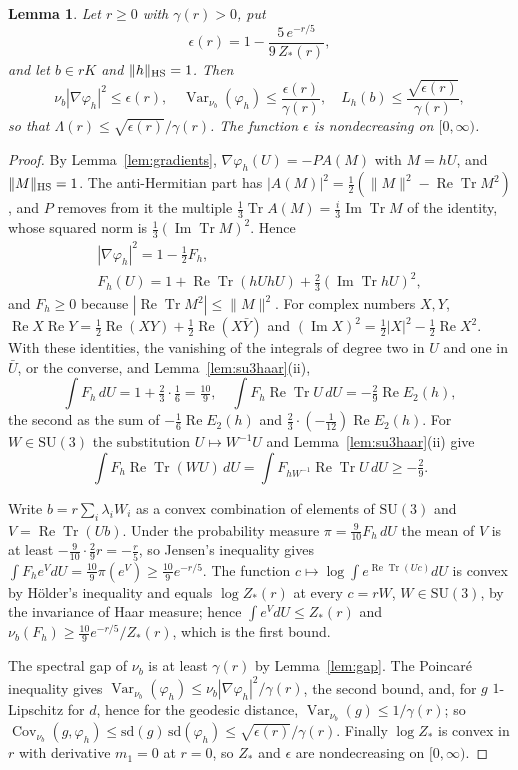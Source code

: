 \documentclass[aps,prd,twocolumn,superscriptaddress,nofootinbib,longbibliography,floatfix,amsmath,amssymb,10pt]{revtex4-2}
\newtheorem{lemma}[theorem]{Lemma}
\theoremstyle{definition}
\theoremstyle{remark}
\newcommand{\SU}{\mathrm{SU}}
\newcommand{\Tr}{\operatorname{Tr}}
\newcommand{\ReTr}{\operatorname{Re}\operatorname{Tr}}
\newcommand{\ImTr}{\operatorname{Im}\operatorname{Tr}}
\newcommand{\Cov}{\operatorname{Cov}}
\newcommand{\Var}{\operatorname{Var}}
\begin{document}
\begin{lemma}\label{lem:su3modulus}
Let $r\ge0$ with $\gamma(r)>0$, put
\[
\epsilon(r)=1-\frac{5\,e^{-r/5}}{9\,Z_*(r)},
\]
and let $b\in rK$ and $\|h\|_{\rm HS}=1$. Then
\[
\nu_b|\nabla\varphi_h|^2\le\epsilon(r),\quad\Var_{\nu_b}(\varphi_h)\le
\frac{\epsilon(r)}{\gamma(r)},\quad L_h(b)\le\frac{\sqrt{\epsilon(r)}}
{\gamma(r)},
\]
so that $\Lambda(r)\le\sqrt{\epsilon(r)}/\gamma(r)$. The function $\epsilon$
is nondecreasing on $[0,\infty)$.
\end{lemma}

\begin{proof}
By Lemma~\ref{lem:gradients}, $\nabla\varphi_h(U)=-PA(M)$ with $M=hU$, and
$\|M\|_{\rm HS}=1$. The anti-Hermitian part has $|A(M)|^2=\frac12(\|M\|^2-
\ReTr M^2)$, and $P$ removes from it the multiple $\frac13\Tr A(M)=\frac i3
\ImTr M$ of the identity, whose squared norm is $\frac13(\ImTr M)^2$. Hence
\begin{gather*}
|\nabla\varphi_h|^2=1-\tfrac12F_h,\\
F_h(U)=1+\ReTr(hUhU)+\tfrac23(\ImTr hU)^2 ,
\end{gather*}
and $F_h\ge0$ because $|\ReTr M^2|\le\|M\|^2$. For complex numbers
$X,Y$, $\operatorname{Re}X\operatorname{Re}Y=\frac12\operatorname{Re}(XY)+
\frac12\operatorname{Re}(X\bar Y)$ and $(\operatorname{Im}X)^2=\frac12|X|^2-
\frac12\operatorname{Re}X^2$. With these identities, the vanishing of the
integrals of degree two in $U$ and one in $\bar U$, or the converse, and
Lemma~\ref{lem:su3haar}(ii),
\[
\int F_h\,dU=1+\tfrac23\cdot\tfrac16=\tfrac{10}9,\quad\int F_h\ReTr U\,dU=
-\tfrac29\operatorname{Re}E_2(h),
\]
the second as the sum of $-\frac16\operatorname{Re}E_2(h)$ and $\frac23
\cdot(-\frac1{12})\operatorname{Re}E_2(h)$. For $W\in\SU(3)$ the
substitution $U\mapsto W^{-1}U$ and Lemma~\ref{lem:su3haar}(ii) give
\[
\int F_h\ReTr(WU)\,dU=\int F_{hW^{-1}}\ReTr U\,dU\ge-\tfrac29 .
\]

Write $b=r\sum_i\lambda_iW_i$ as a convex combination of elements of
$\SU(3)$ and $V=\ReTr(Ub)$. Under the probability measure $\pi=\frac9{10}
F_h\,dU$ the mean of $V$ is at least $-\frac9{10}\cdot\frac29r=-\frac r5$,
so Jensen's inequality gives $\int F_he^VdU=\frac{10}9\pi(e^V)\ge\frac{10}9
e^{-r/5}$. The function $c\mapsto\log\int e^{\ReTr(Uc)}dU$ is convex by
H\"older's inequality and equals $\log Z_*(r)$ at every $c=rW$, $W\in
\SU(3)$, by the invariance of Haar measure; hence $\int e^VdU\le Z_*(r)$
and $\nu_b(F_h)\ge\frac{10}9e^{-r/5}/Z_*(r)$, which is the first bound.

The spectral gap of $\nu_b$ is at least $\gamma(r)$ by Lemma~\ref{lem:gap}.
The Poincar\'e inequality gives $\Var_{\nu_b}(\varphi_h)\le\nu_b|\nabla
\varphi_h|^2/\gamma(r)$, the second bound, and, for $g$ $1$-Lipschitz for
$d$, hence for the geodesic distance, $\Var_{\nu_b}(g)\le1/\gamma(r)$; so
$\Cov_{\nu_b}(g,\varphi_h)\le\mathrm{sd}(g)\,\mathrm{sd}(\varphi_h)\le
\sqrt{\epsilon(r)}/\gamma(r)$. Finally $\log Z_*$ is convex in $r$ with
derivative $m_1=0$ at $r=0$, so $Z_*$ and $\epsilon$ are nondecreasing on
$[0,\infty)$.
\end{proof}
\end{document}
